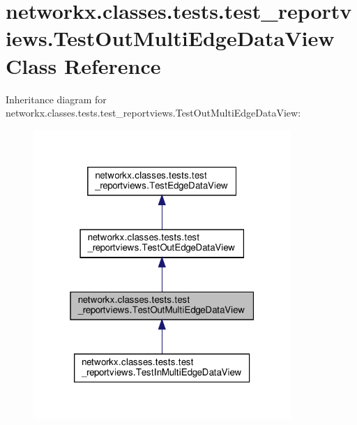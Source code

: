 \hypertarget{classnetworkx_1_1classes_1_1tests_1_1test__reportviews_1_1TestOutMultiEdgeDataView}{}\section{networkx.\+classes.\+tests.\+test\+\_\+reportviews.\+Test\+Out\+Multi\+Edge\+Data\+View Class Reference}
\label{classnetworkx_1_1classes_1_1tests_1_1test__reportviews_1_1TestOutMultiEdgeDataView}


Inheritance diagram for networkx.\+classes.\+tests.\+test\+\_\+reportviews.\+Test\+Out\+Multi\+Edge\+Data\+View\+:
\nopagebreak
\begin{figure}[H]
\begin{center}
\leavevmode
\includegraphics[width=277pt]{classnetworkx_1_1classes_1_1tests_1_1test__reportviews_1_1TestOutMultiEdgeDataView__inherit__graph}
\end{center}
\end{figure}


